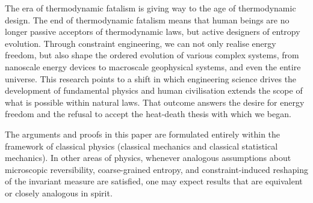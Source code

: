 \documentclass[11pt,a4paper]{article}
\begin{document}
The era of thermodynamic fatalism is giving way to the age of thermodynamic design.
The end of thermodynamic fatalism means that human beings are no longer passive
acceptors of thermodynamic laws, but active designers of entropy evolution.
Through constraint engineering, we can not only realise energy freedom, but also
shape the ordered evolution of various complex systems, from nanoscale energy
devices to macroscale geophysical systems, and even the entire universe. This research points to a shift in which engineering science drives the
development of fundamental physics and human civilisation extends the scope of
what is possible within natural laws. That outcome answers the desire for energy freedom and the
refusal to accept the heat-death thesis with which we began.

The arguments and proofs in this paper are formulated entirely within the
framework of classical physics (classical mechanics and classical statistical
mechanics). In other areas of physics, whenever analogous assumptions about
microscopic reversibility, coarse-grained entropy, and constraint-induced
reshaping of the invariant measure are satisfied, one may expect results that
are equivalent or closely analogous in spirit.
\end{document}
